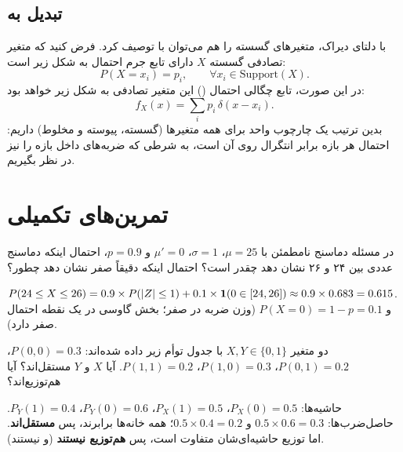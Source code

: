\begin{center}
\end{center}

\subsection{تبدیل  به }
با دلتای دیراک، متغیرهای گسسته را هم می‌توان با  توصیف کرد. فرض کنید که متغیر تصادفی گسسته $X$ دارای تابع جرم احتمال به شکل زیر است:
\[
P(X=x_i)=p_i,\qquad\forall x_i\in\mathrm{Support}(X).
\]
در این صورت، تابع چگالی احتمال () این متغیر تصادفی به شکل زیر خواهد بود:
\[
f_X(x)=\sum_ip_i\,\delta(x-x_i).
\]
بدین ترتیب یک چارچوب واحد برای همه متغیرها (گسسته، پیوسته و مخلوط) داریم: احتمال هر بازه برابر انتگرال  روی آن است، به شرطی که ضربه‌های داخل بازه را نیز در نظر بگیریم.

\section{تمرین‌های تکمیلی}

\begin{exercise}
در مسئله دماسنج نامطمئن با $\mu=25$، $\sigma=1$، $\mu'=0$ و $p=0.9$، احتمال اینکه دماسنج عددی بین ۲۴ و ۲۶ نشان دهد چقدر است؟ احتمال اینکه دقیقاً صفر نشان دهد چطور؟
\end{exercise}
\begin{solution}
$P(24\le X\le26)=0.9\times P(|Z|\le1)+0.1\times\mathbf{1}(0\in[24,26])\approx0.9\times0.683=0.615$.
و $P(X=0)=1-p=0.1$ (وزن ضربه در صفر؛ بخش گاوسی در یک نقطه احتمال صفر دارد).
\end{solution}

\begin{exercise}
دو متغیر $X,Y\in\{0,1\}$ با جدول توأم زیر داده شده‌اند: $P(0,0)=0.3$، $P(0,1)=0.2$، $P(1,0)=0.3$، $P(1,1)=0.2$. آیا $X$ و $Y$ مستقل‌اند؟ آیا هم‌توزیع‌اند؟
\end{exercise}
\begin{solution}
حاشیه‌ها: $P_X(0)=0.5$، $P_X(1)=0.5$، $P_Y(0)=0.6$، $P_Y(1)=0.4$. حاصل‌ضرب‌ها: $0.5\times0.6=0.3$ و $0.5\times0.4=0.2$؛ همه خانه‌ها برابرند، پس \textbf{مستقل‌اند}. اما توزیع حاشیه‌ای‌شان متفاوت است، پس \textbf{هم‌توزیع نیستند} (و  نیستند).
\end{solution}

